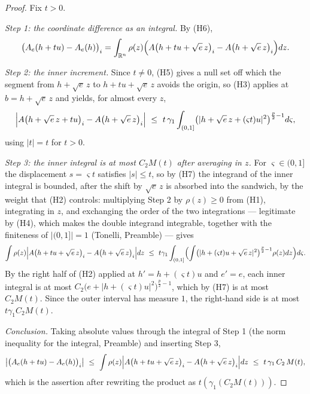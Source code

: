 \begin{proof}
Fix $t>0$.

\emph{Step 1: the coordinate difference as an integral.}  By (H6),
\[
\bigl(A_e(h+tu)-A_e(h)\bigr)_i
=\int_{\mathbb{R}^n}\rho(z)\Bigl(A\bigl(h+tu+\sqrt e\,z\bigr)_i-A\bigl(h+\sqrt e\,z\bigr)_i\Bigr)dz .
\]

\emph{Step 2: the inner increment.}  Since $t\neq0$, (H5) gives a null set off
which the segment from $h+\sqrt e\,z$ to $h+tu+\sqrt e\,z$ avoids the origin,
so (H3) applies at $b=h+\sqrt e\,z$ and yields, for almost every $z$,
\[
\Bigl|A\bigl(h+\sqrt e\,z+tu\bigr)_i-A\bigl(h+\sqrt e\,z\bigr)_i\Bigr|
\ \le\ t\,\gamma_1\int_{(0,1]}\bigl(|h+\sqrt e\,z+(\varsigma t)u|^2\bigr)^{\frac p2-1}d\varsigma,
\]
using $|t|=t$ for $t>0$.

\emph{Step 3: the inner integral is at most $C_2M(t)$ after averaging in $z$.}
For $\varsigma\in(0,1]$ the displacement $s=\varsigma t$ satisfies $|s|\le t$,
so by (H7) the integrand of the inner integral is bounded, after the shift by
$\sqrt e\,z$ is absorbed into the sandwich, by the weight that (H2) controls:
multiplying Step 2 by $\rho(z)\ge0$ from (H1), integrating in $z$, and
exchanging the order of the two integrations --- legitimate by (H4), which
makes the double integrand integrable, together with the finiteness of
$|(0,1]|=1$ (Tonelli, Preamble) --- gives
\[
\int\rho(z)\Bigl|A\bigl(h+tu+\sqrt e\,z\bigr)_i-A\bigl(h+\sqrt e\,z\bigr)_i\Bigr|dz
\ \le\ t\gamma_1\int_{(0,1]}\Bigl(\int\bigl(|h+(\varsigma t)u+\sqrt e\,z|^2\bigr)^{\frac p2-1}\rho(z)dz\Bigr)d\varsigma .
\]
By the right half of (H2) applied at $h'=h+(\varsigma t)u$ and $e'=e$, each
inner integral is at most
$C_2\bigl(e+|h+(\varsigma t)u|^2\bigr)^{\frac p2-1}$, which by (H7) is at most
$C_2M(t)$.  Since the outer interval has measure $1$, the right-hand side is at
most $t\gamma_1C_2M(t)$.

\emph{Conclusion.}  Taking absolute values through the integral of Step 1 (the
norm inequality for the integral, Preamble) and inserting Step 3,
\[
\bigl|\bigl(A_e(h+tu)-A_e(h)\bigr)_i\bigr|
\ \le\ \int\rho(z)\Bigl|A\bigl(h+tu+\sqrt e\,z\bigr)_i-A\bigl(h+\sqrt e\,z\bigr)_i\Bigr|dz
\ \le\ t\,\gamma_1\,C_2\,M(t),
\]
which is the assertion after rewriting the product as $t(\gamma_1(C_2M(t)))$.
\end{proof}
